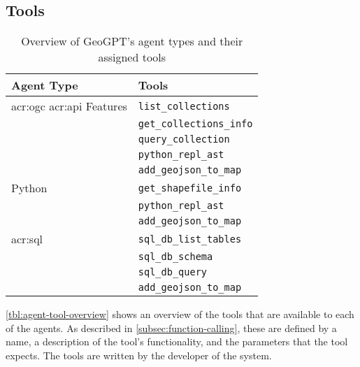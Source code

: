 \subsection{Tools}
\label{subsec:tools}

\begin{table}[h]
    \centering
    \caption{Overview of GeoGPT's agent types and their assigned tools}
    \label{tbl:agent-tool-overview}
    \begin{tabularx}{0.7\textwidth}{XX}
        \toprule
        \textbf{Agent Type}                            & \textbf{Tools}                  \\
        \midrule
        \acrshort{acr:ogc} \acrshort{acr:api} Features & \texttt{list\_collections}      \\
                                                       & \texttt{get\_collections\_info} \\
                                                       & \texttt{query\_collection}      \\
                                                       & \texttt{python\_repl\_ast}      \\
                                                       & \texttt{add\_geojson\_to\_map}  \\
        \midrule
        Python                                         & \texttt{get\_shapefile\_info}   \\
                                                       & \texttt{python\_repl\_ast}      \\
                                                       & \texttt{add\_geojson\_to\_map}  \\
        \midrule
        \acrshort{acr:sql}                             & \texttt{sql\_db\_list\_tables}  \\
                                                       & \texttt{sql\_db\_schema}        \\
                                                       & \texttt{sql\_db\_query}         \\
                                                       & \texttt{add\_geojson\_to\_map}  \\
        \bottomrule
    \end{tabularx}
\end{table}

\autoref{tbl:agent-tool-overview} shows an overview of the tools that are available to each of the agents. As described in \autoref{subsec:function-calling}, these are defined by a name, a description of the tool's functionality, and the parameters that the tool expects. The tools are written by the developer of the system.

